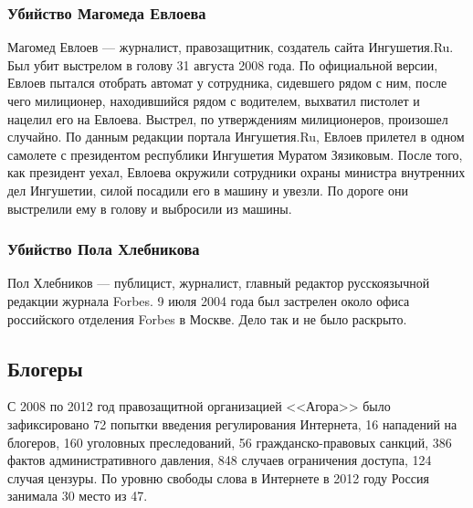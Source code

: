 \subsubsection{Убийство Магомеда Евлоева}
Магомед Евлоев --- журналист, правозащитник, создатель сайта Ингушетия.Ru. Был убит выстрелом в голову 31 августа 2008 года. По официальной версии, Евлоев пытался отобрать автомат у сотрудника, сидевшего рядом с ним, после чего милиционер, находившийся рядом с водителем, выхватил пистолет и нацелил его на Евлоева. Выстрел, по утверждениям милиционеров, произошел случайно\cite{evloev_mvd}. По данным редакции портала Ингушетия.Ru, Евлоев прилетел в одном самолете с президентом республики Ингушетия Муратом Зязиковым. После того, как президент уехал, Евлоева окружили сотрудники охраны министра внутренних дел Ингушетии, силой посадили его в машину и увезли. По дороге они выстрелили ему в голову и выбросили из машины\cite{evloev_death}.
\subsubsection{Убийство Пола Хлебникова}
Пол Хлебников --- публицист, журналист, главный редактор русскоязычной редакции журнала Forbes. 9 июля 2004 года был застрелен около офиса российского отделения Forbes в Москве\cite{hlebnikov_death}. Дело так и не было раскрыто.
\subsection{Блогеры}
С 2008 по 2012 год правозащитной организацией <<Агора>> было зафиксировано 72 попытки введения регулирования Интернета, 16 нападений на блогеров, 160 уголовных преследований, 56 гражданско-правовых санкций, 386 фактов административного давления, 848 случаев ограничения доступа, 124 случая цензуры\cite{agoranet,agoranet2011,agoranet2012}. По уровню свободы слова в Интернете в 2012 году Россия занимала 30 место из 47\cite{netfreedom}.
